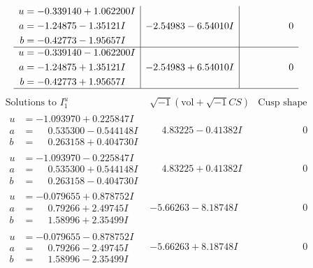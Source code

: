 \documentclass[1p]{elsarticle_modified}
\theoremstyle{definition}
\newcommand{\I}{\sqrt{-1}}
\begin{document}
$$\begin{array}{c|c|c}
\begin{aligned}
u &= -0.339140 + 1.062200 I \\
a &= -1.24875 - 1.35121 I \\
b &= -0.42773 - 1.95657 I\end{aligned}
 & -2.54983 - 6.54010 I & \phantom{-0.000000 } 0 \\ \hline\begin{aligned}
u &= -0.339140 - 1.062200 I \\
a &= -1.24875 + 1.35121 I \\
b &= -0.42773 + 1.95657 I\end{aligned}
 & -2.54983 + 6.54010 I & \phantom{-0.000000 } 0\\
 \hline 
 \end{array}$$\newpage$$\begin{array}{c|c|c}  
\text{Solutions to }I^u_{1}& \I (\text{vol} + \sqrt{-1}CS) & \text{Cusp shape}\\
 \hline 
\begin{aligned}
u &= -1.093970 + 0.225847 I \\
a &= \phantom{-}0.535300 - 0.544148 I \\
b &= \phantom{-}0.263158 + 0.404730 I\end{aligned}
 & \phantom{-}4.83225 - 0.41382 I & \phantom{-0.000000 } 0 \\ \hline\begin{aligned}
u &= -1.093970 - 0.225847 I \\
a &= \phantom{-}0.535300 + 0.544148 I \\
b &= \phantom{-}0.263158 - 0.404730 I\end{aligned}
 & \phantom{-}4.83225 + 0.41382 I & \phantom{-0.000000 } 0 \\ \hline\begin{aligned}
u &= -0.079655 + 0.878752 I \\
a &= \phantom{-}0.79266 + 2.49745 I \\
b &= \phantom{-}1.58996 + 2.35499 I\end{aligned}
 & -5.66263 - 8.18748 I & \phantom{-0.000000 } 0 \\ \hline\begin{aligned}
u &= -0.079655 - 0.878752 I \\
a &= \phantom{-}0.79266 - 2.49745 I \\
b &= \phantom{-}1.58996 - 2.35499 I\end{aligned}
 & -5.66263 + 8.18748 I & \phantom{-0.000000 } 0 \\ \hline\begin{aligned}

\end{aligned}
\end{array}$$
\end{document}
